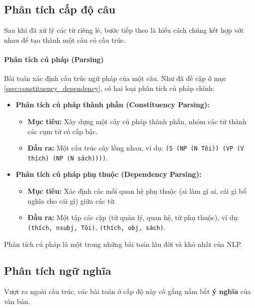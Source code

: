 \subsection{Phân tích cấp độ câu}
\label{ssec:phan_tich_cau}

Sau khi đã xử lý các từ riêng lẻ, bước tiếp theo là hiểu cách chúng kết hợp với nhau để tạo thành một câu có cấu trúc.

\paragraph{Phân tích cú pháp (Parsing)}
Bài toán xác định cấu trúc ngữ pháp của một câu. Như đã đề cập ở mục \ref{ssec:constituency_dependency}, có hai loại phân tích cú pháp chính:
\begin{itemize}
    \item \textbf{Phân tích cú pháp thành phần (Constituency Parsing):}
        \begin{itemize}
            \item \textbf{Mục tiêu:} Xây dựng một cây cú pháp thành phần, nhóm các từ thành các cụm từ có cấp bậc.
            \item \textbf{Đầu ra:} Một cấu trúc cây lồng nhau, ví dụ: \texttt{(S (NP (N Tôi)) (VP (V thích) (NP (N sách))))}.
        \end{itemize}
    \item \textbf{Phân tích cú pháp phụ thuộc (Dependency Parsing):}
        \begin{itemize}
            \item \textbf{Mục tiêu:} Xác định các mối quan hệ phụ thuộc (ai làm gì ai, cái gì bổ nghĩa cho cái gì) giữa các từ.
            \item \textbf{Đầu ra:} Một tập các cặp (từ quản lý, quan hệ, từ phụ thuộc), ví dụ: \texttt{(thích, nsubj, Tôi)}, \texttt{(thích, obj, sách)}.
        \end{itemize}
\end{itemize}
Phân tích cú pháp là một trong những bài toán lâu đời và khó nhất của NLP.

\subsection{Phân tích ngữ nghĩa}
\label{ssec:phan_tich_ngu_nghia}

Vượt ra ngoài cấu trúc, các bài toán ở cấp độ này cố gắng nắm bắt \textbf{ý nghĩa} của văn bản.

